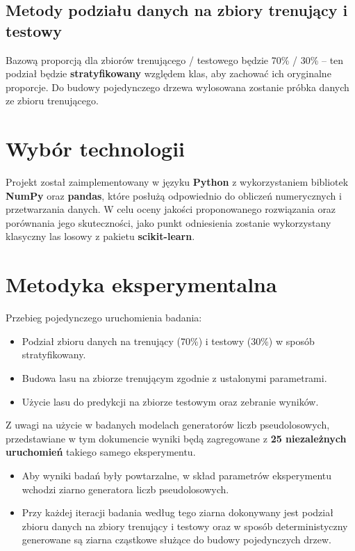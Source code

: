 \documentclass[a4paper]{article}
\begin{document}
\subsection{Metody podziału danych na zbiory trenujący i testowy}

Bazową proporcją dla zbiorów trenującego / testowego będzie 70\% / 30\% -- ten podział będzie \textbf{stratyfikowany} względem klas, aby zachować ich oryginalne proporcje. Do budowy pojedynczego drzewa wylosowana zostanie próbka danych ze zbioru trenującego.

\section{Wybór technologii}

Projekt został zaimplementowany w języku \textbf{Python} z wykorzystaniem bibliotek \textbf{NumPy} oraz \textbf{pandas}, które posłużą odpowiednio do obliczeń numerycznych i przetwarzania danych. W celu oceny jakości proponowanego rozwiązania oraz porównania jego skuteczności, jako punkt odniesienia zostanie wykorzystany klasyczny las losowy z pakietu \textbf{scikit-learn}.

\section{Metodyka eksperymentalna}

Przebieg pojedynczego uruchomienia badania:
\begin{itemize}
    \item Podział zbioru danych na trenujący (70\%) i testowy (30\%) w sposób stratyfikowany.
    \item Budowa lasu na zbiorze trenującym zgodnie z ustalonymi parametrami.
    \item Użycie lasu do predykcji na zbiorze testowym oraz zebranie wyników.
\end{itemize}

Z uwagi na użycie w badanych modelach generatorów liczb pseudolosowych, przedstawiane w tym dokumencie wyniki będą zagregowane z \textbf{25 niezależnych uruchomień} takiego samego eksperymentu.
\begin{itemize}
    \item Aby wyniki badań były powtarzalne, w skład parametrów eksperymentu wchodzi ziarno generatora liczb pseudolosowych.
    \item Przy każdej iteracji badania według tego ziarna dokonywany jest podział zbioru danych na zbiory trenujący i testowy oraz w sposób deterministyczny generowane są ziarna cząstkowe służące do budowy pojedynczych drzew.
\end{itemize}
\end{document}
